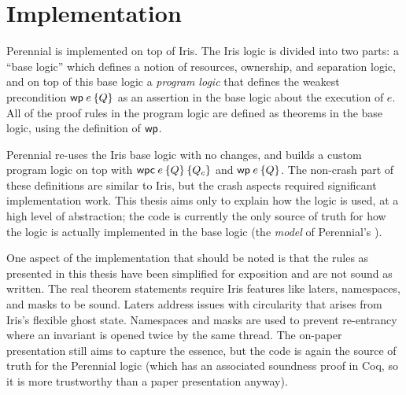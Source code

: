 \section{Implementation}
\label{sec:perennial:impl}

Perennial is implemented on top of Iris. The Iris logic is divided into two
parts: a ``base logic'' which defines a notion of resources, ownership, and
separation logic, and on top of this base logic a \emph{program logic} that
defines the weakest precondition $\wpre{e}{Q}$ as an assertion in the base logic
about the execution of $e$. All of the proof rules in the program logic are
defined as theorems in the base logic, using the definition of $\textsf{\upshape wp}$.

Perennial re-uses the Iris base logic with no changes, and builds a custom
program logic on top with $\wpc{e}{Q}{Q_{c}}$ and $\wpre{e}{Q}$. The non-crash
part of these definitions are similar to Iris, but the crash aspects required
significant implementation work. This thesis aims only to explain how the logic
is used, at a high level of abstraction; the code is currently the only
source of truth for how the logic is actually implemented in the base logic (the
\emph{model} of Perennial's \wpcw).

One aspect of the implementation that should be noted is that the rules as
presented in this thesis have been simplified for exposition and are not sound
as written. The real theorem statements require Iris features like laters,
namespaces, and masks to be sound. Laters address issues with circularity that
arises from Iris's flexible ghost state. Namespaces and masks are used to
prevent re-entrancy where an invariant is opened twice by the same thread. The
on-paper presentation still aims to capture the essence, but the code is again
the source of truth for the Perennial logic (which has an associated soundness
proof in Coq, so it is more trustworthy than a paper presentation anyway).
